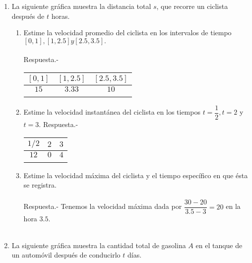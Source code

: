 \begin{enumerate}
\begin{enumerate}[\bfseries a)]
\end{enumerate}
    
\item La siguiente gráfica muestra la distancia total $s$, que recorre un ciclista después de $t$ horas.
\begin{enumerate}[\bfseries a)]

    \item Estime la velocidad promedio del ciclista en los intervalos de tiempo $[0, 1], [1, 2.5] y [2.5, 3.5].$\\\\
	Respuesta.-\; 
	\begin{center}
	    \begin{tabular}{c|c|c}
		$[0,1]$&$[1,2.5]$&$[2.5,3.5]$\\
		\hline
		$15$&$3.33$&$10$\\\\
	    \end{tabular}
	\end{center}

    \item Estime la velocidad instantánea del ciclista en los tiempos $t = \dfrac{1}{2}, t = 2$ y $t = 3.$
	Respuesta.-\; 
	\begin{center}
	    \begin{tabular}{c|c|c}
		$1/2$&$2$&$3$\\
		\hline
		$12$&$0$&$4$\\\\
	    \end{tabular}
	\end{center}

    \item Estime la velocidad máxima del ciclista y el tiempo específico en que ésta se registra.\\\\
	Respuesta.-\; Tenemos la velocidad máxima dada por $\dfrac{30-20}{3.5-3} = 20$ en la hora $3.5$.\\\\

\end{enumerate}

\item La siguiente gráfica muestra la cantidad total de gasolina $A$ en el tanque de un automóvil después de conducirlo $t$ días.

\begin{enumerate}[\bfseries a)]


\end{enumerate}
\end{enumerate}
